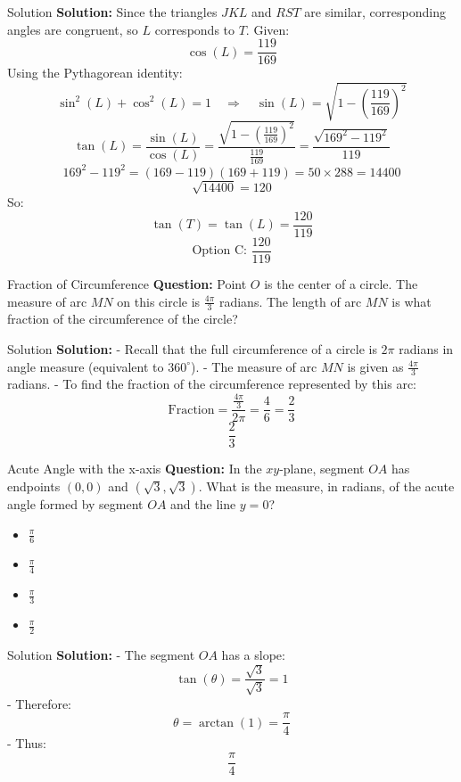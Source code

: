 \documentclass{beamer}
\begin{document}
\begin{frame}{Solution}
\footnotesize
\textbf{Solution:}  
Since the triangles \(JKL\) and \(RST\) are similar, corresponding angles are congruent, so \(L\) corresponds to \(T\).  
Given:  
\[
\cos(L) = \frac{119}{169}
\]
Using the Pythagorean identity:  
\[
\sin^2(L) + \cos^2(L) = 1 \quad \Longrightarrow \quad \sin(L) = \sqrt{1 - \left(\frac{119}{169}\right)^2}
\]
\[
\tan(L) = \frac{\sin(L)}{\cos(L)} = \frac{\sqrt{1 - \left(\frac{119}{169}\right)^2}}{\frac{119}{169}} = \frac{\sqrt{169^2 - 119^2}}{119}
\]
\[
169^2 - 119^2 = (169 - 119)(169 + 119) = 50 \times 288 = 14400
\]
\[
\sqrt{14400} = 120
\]
So:  
\[
\tan(T) = \tan(L) = \frac{120}{119}
\]
\[
\boxed{\text{Option C: } \frac{120}{119}}
\]
\end{frame}

\begin{frame}{Fraction of Circumference}
\textbf{Question:}  
Point \( O \) is the center of a circle. The measure of arc \( MN \) on this circle is \(\frac{4\pi}{3}\) radians. The length of arc \( MN \) is what fraction of the circumference of the circle?
\end{frame}

\begin{frame}{Solution}
\textbf{Solution:}  
- Recall that the full circumference of a circle is \(2\pi\) radians in angle measure (equivalent to \(360^\circ\)).
- The measure of arc \( MN \) is given as \(\frac{4\pi}{3}\) radians.
- To find the fraction of the circumference represented by this arc:
\[
\text{Fraction} = \frac{\frac{4\pi}{3}}{2\pi} = \frac{4}{6} = \frac{2}{3}
\]
\[
\boxed{\frac{2}{3}}
\]
\end{frame}

\begin{frame}{Acute Angle with the x-axis}
\textbf{Question:}  
In the \( xy \)-plane, segment \( OA \) has endpoints \( (0,0) \) and \( (\sqrt{3}, \sqrt{3}) \). What is the measure, in radians, of the acute angle formed by segment \( OA \) and the line \( y = 0 \)?
\begin{itemize}
    \item[A)] \( \frac{\pi}{6} \)
    \item[B)] \( \frac{\pi}{4} \)
    \item[C)] \( \frac{\pi}{3} \)
    \item[D)] \( \frac{\pi}{2} \)
\end{itemize}
\end{frame}

\begin{frame}{Solution}
\textbf{Solution:}  
- The segment \( OA \) has a slope:
\[
\tan(\theta) = \frac{\sqrt{3}}{\sqrt{3}} = 1
\]
- Therefore:
\[
\theta = \arctan(1) = \frac{\pi}{4}
\]
- Thus:
\[
\boxed{\frac{\pi}{4}}
\]
\end{frame}
\end{document}
